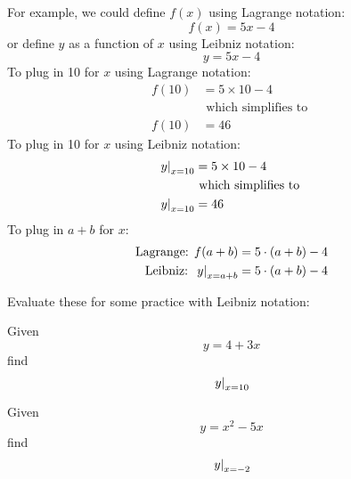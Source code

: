 For example, we could define $f(x)$ using Lagrange notation:
\begin{equation*}
 f(x) = 5 x - 4
\end{equation*}
or define $y$ as a function of $x$ using Leibniz notation:
\begin{equation*}
 y = 5 x - 4
\end{equation*}
To plug in 10 for $x$ using Lagrange notation:
\begin{equation*}
 \begin{split}
   f(10) &= 5 \times 10 - 4
   \\
   & \text{ which simplifies to }
   \\
   f(10) &= 46
 \end{split}
\end{equation*}
To plug in 10 for $x$ using Leibniz notation:
\begin{equation*}
 \begin{split}
   \left.y\right|_{x=10} &= 5 \times 10 - 4
   \\
   & \text{ which simplifies to }
   \\
   \left.y\right|_{x=10} &= 46
 \end{split}
\end{equation*}
To plug in $a + b$ for $x$:
\begin{equation*}
 \begin{split}
   \text{Lagrange: } f(a + b) &= 5 \cdot (a + b) - 4
   \\
   \text{Leibniz: } \left.y\right|_{x=a+b} &= 5 \cdot (a + b) - 4
 \end{split}
\end{equation*}

Evaluate these for some practice with Leibniz notation:

\begin{multicols}{2}
 \begin{ProblemSet}[pencil space=1in]
  \begin{Problem}
   Given
   \begin{equation*}
    y = 4 + 3 x
   \end{equation*}
   find
   \begin{equation*}
    \left.y\right|_{x = 10}
   \end{equation*}
  \end{Problem}
  \begin{Problem}
   Given
   \begin{equation*}
    y = x^2 - 5 x
   \end{equation*}
   find
   \begin{equation*}
    \left.y\right|_{x = -2}
   \end{equation*}
  \end{Problem}
 \end{ProblemSet}
\end{multicols}

